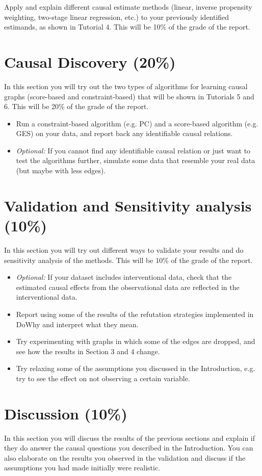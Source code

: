 Apply and explain different causal estimate methods (linear, inverse propensity weighting, two-stage linear regression, etc.) to your previously identified estimands, as shown in Tutorial 4.
This will be 10\% of the grade of the report.

\section{Causal Discovery (20\%)}

In this section you will try out the two types of algorithms for learning causal graphs (score-based and constraint-based) that will be shown in Tutorials 5 and 6.
This will be 20\% of the grade of the report.

\begin{itemize}
    \item Run a constraint-based algorithm (e.g. PC) and a score-based algorithm (e.g. GES) on your data, and report back any identifiable causal relations.
    \item \emph{Optional:}  If you cannot find any identifiable causal relation or just want to test the algorithms further, simulate some data that resemble your real data (but maybe with less edges).
\end{itemize}

\section{Validation and Sensitivity analysis (10\%)}

In this section you will try out different ways to validate your results and do sensitivity analysis of the methods. 
This will be 10\% of the grade of the report.

\begin{itemize}
    \item  \emph{Optional:} If your dataset includes interventional data, check that the estimated causal effects from the observational data are reflected in the interventional data.
    \item Report using some of the results of the refutation strategies implemented in DoWhy and interpret what they mean.
    \item Try experimenting with graphs in which some of the edges are dropped, and see how the results in Section 3 and 4 change.
    \item Try relaxing some of the assumptions you discussed in the Introduction, e.g. try to see the effect on not observing a certain variable.
\end{itemize}



\section{Discussion (10\%)}
In this section you will discuss the results of the previous sections and explain if they do answer the causal questions you described in the Introduction. You can also elaborate on the results you observed in the validation and discuss if the assumptions you had made initially were realistic.